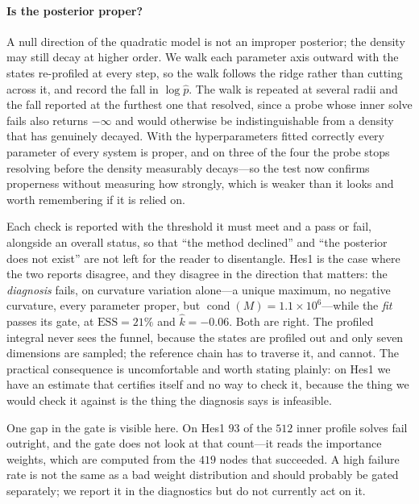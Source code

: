 \documentclass[11pt]{article}
\newcommand{\khat}{\widehat{k}}
\theoremstyle{plain}
\theoremstyle{definition}
\theoremstyle{remark}
\begin{document}
\paragraph{Is the posterior proper?} A null direction of the quadratic model is not an improper
posterior; the density may still decay at higher order. We walk each parameter axis outward with
the states re-profiled at every step, so the walk follows the ridge rather than cutting across it,
and record the fall in $\log\hat p$. The walk is repeated at several radii and the fall reported at
the furthest one that resolved, since a probe whose inner solve fails also returns $-\infty$ and
would otherwise be indistinguishable from a density that has genuinely decayed. With the
hyperparameters fitted correctly every parameter of every system is proper, and on three of the
four the probe stops resolving before the density measurably decays---so the test now confirms
properness without measuring how strongly, which is weaker than it looks and worth remembering if
it is relied on.

Each check is reported with the threshold it must meet and a pass or fail, alongside an overall
status, so that ``the method declined'' and ``the posterior does not exist'' are not left for the
reader to disentangle. Hes1 is the case where the two reports disagree, and they disagree in the
direction that matters: the \emph{diagnosis} fails, on curvature variation alone---a unique
maximum, no negative curvature, every parameter proper, but $\operatorname{cond}(M) = 1.1\times
10^{6}$---while the \emph{fit} passes its gate, at $\mathrm{ESS} = 21\%$ and $\khat = -0.06$. Both
are right. The profiled integral never sees the funnel, because the states are profiled out and
only seven dimensions are sampled; the reference chain has to traverse it, and cannot. The
practical consequence is uncomfortable and worth stating plainly: on Hes1 we have an estimate that
certifies itself and no way to check it, because the thing we would check it against is the thing
the diagnosis says is infeasible.

One gap in the gate is visible here. On Hes1 $93$ of the $512$ inner profile solves fail outright,
and the gate does not look at that count---it reads the importance weights, which are computed from
the $419$ nodes that succeeded. A high failure rate is not the same as a bad weight distribution
and should probably be gated separately; we report it in the diagnostics but do not currently act
on it.
\end{document}
